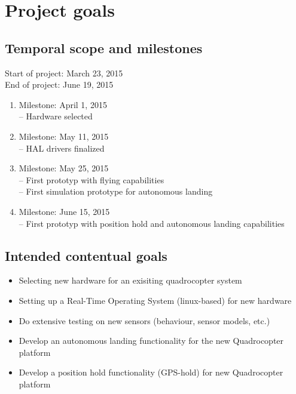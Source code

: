 \chapter{Project goals}
\label{sec:goals}

\section{Temporal scope and milestones}
\label{sec:goals:scope}
Start of project: March 23, 2015\\
End of project: June 19, 2015

\begin{enumerate}
	\item Milestone: April 1, 2015\\
				-- Hardware selected
	\item Milestone: May 11, 2015\\
				-- HAL drivers finalized
	\item Milestone: May 25, 2015\\
				-- First prototyp with flying capabilities\\
				-- First simulation prototype for autonomous landing
	\item Milestone: June 15, 2015\\
				-- First prototyp with position hold and autonomous landing capabilities
\end{enumerate}

\section{Intended contentual goals}
\label{sec:goals:intention}
\begin{itemize}
	\item Selecting new hardware for an exisiting quadrocopter system
	\item Setting up a Real-Time Operating System (linux-based) for new hardware
	\item Do extensive testing on new sensors (behaviour, sensor models, etc.)
	\item Develop an autonomous landing functionality for the new Quadrocopter platform
	\item Develop a position hold functionality (GPS-hold) for new Quadrocopter platform
\end{itemize}

